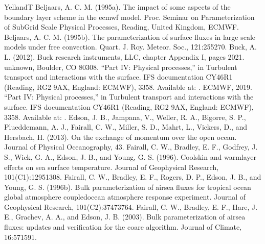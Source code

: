 \documentclass[letterpaper,10pt,english]{sphinxmanual}
\begin{document}
\begin{sphinxthebibliography}{YellandT}
\sphinxAtStartPar
Beljaars, A. C. M. (1995a). The impact of some aspects of the boundary layer scheme in the ecmwf model. Proc. Seminar on Parameterization of Sub\sphinxhyphen{}Grid Scale Physical Processes, Reading, United Kingdom, ECMWF.
\sphinxAtStartPar
Beljaars, A. C. M. (1995b). The parameterization of surface fluxes in large scale models under free convection. Quart. J. Roy. Meteor. Soc., 121:255\textendash{}270.
\sphinxAtStartPar
Buck, A. L. (2012). Buck research instruments, LLC, chapter Appendix I, pages 20\textendash{}21. unknown, Boulder, CO 80308.
\sphinxAtStartPar
“Part IV: Physical processes,” in Turbulent transport and interactions with the surface. IFS documentation CY46R1 (Reading, RG2 9AX, England: ECMWF), 33\textendash{}58. Available at: .
\sphinxAtStartPar
ECMWF, 2019. “Part IV: Physical processes,” in Turbulent transport and interactions with the surface. IFS documentation CY46R1 (Reading, RG2 9AX, England: ECMWF), 33\textendash{}58. Available at: .
\sphinxAtStartPar
Edson, J. B., Jampana, V., Weller, R. A., Bigorre, S. P., Plueddemann, A. J., Fairall, C. W., Miller, S. D., Mahrt, L., Vickers, D., and Hersbach, H. (2013). On the exchange of momentum over the open ocean. Journal of Physical Oceanography, 43.
\sphinxAtStartPar
Fairall, C. W., Bradley, E. F., Godfrey, J. S., Wick, G. A., Edson, J. B., and Young, G. S. (1996). Cool\sphinxhyphen{}skin and warm\sphinxhyphen{}layer effects on sea surface temperature. Journal of Geophysical Research, 101(C1):1295\textendash{}1308.
\sphinxAtStartPar
Fairall, C. W., Bradley, E. F., Rogers, D. P., Edson, J. B., and Young, G. S. (1996b). Bulk parameterization of air\sphinxhyphen{}sea fluxes for tropical ocean global atmosphere coupled\sphinxhyphen{}ocean atmosphere response experiment. Journal of Geophysical Research, 101(C2):3747\textendash{}3764.
\sphinxAtStartPar
Fairall, C. W., Bradley, E. F., Hare, J. E., Grachev, A. A., and Edson, J. B. (2003). Bulk parameterization of air\sphinxhyphen{}sea fluxes: updates and verification for the coare algorithm. Journal of Climate, 16:571\textendash{}591.

\end{sphinxthebibliography}
\end{document}
